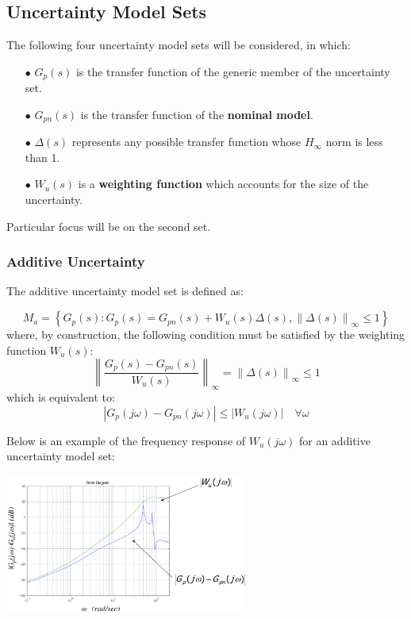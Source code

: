 \documentclass{article}
\numberwithin{equation}{subsection}
\begin{document}
	\subsection{Uncertainty Model Sets}
	The following four uncertainty model sets will be considered, in which:
	\begin{enumerate}
		\item[$\bullet$] $G_p(s) $ is the transfer function of the generic member of the uncertainty set. 
		\item[$\bullet$] $G_{pn}(s)$ is the transfer function of the \textbf{nominal model}.
		\item[$\bullet$] $\Delta(s)$ represents any possible transfer function whose $H_\infty$ norm is less than 1.
		\item[$\bullet$] $W_u(s)$ is a \textbf{weighting function} which accounts for the size of the uncertainty.
	\end{enumerate} 
	Particular focus will be on the second set.
	\subsubsection{Additive Uncertainty}
	The additive uncertainty model set is defined as:
	
	\begin{equation}
		M_a = \left\{ G_p(s): G_p(s)=G_{pn}(s)+W_u(s)\Delta(s), \left\lVert\Delta(s)\right\rVert_\infty \leq1 \right\}
	\end{equation}
	where, by construction, the following condition must be satisfied by the weighting function $W_u(s)$:
	\begin{equation}
		\left\lVert \dfrac{G_p(s)-G_{pn}(s)}{W_u(s)} \right\rVert_\infty = \left\lVert \Delta(s) \right\rVert_\infty \leq 1
	\end{equation}
	which is equivalent to:
	\begin{equation}
		\left| G_p(j\omega)-G_{pn}(j\omega) \right| \leq \left| W_u(j\omega) \right| \quad \forall \omega
	\end{equation}
	
	Below is an example of the frequency response of $W_u(j\omega)$ for an additive uncertainty model set:
	
	\centering
	\includegraphics[width=0.6\textwidth]{images/additive_uncertainty.png}
	\label{fig:image3}
	
\end{document}
